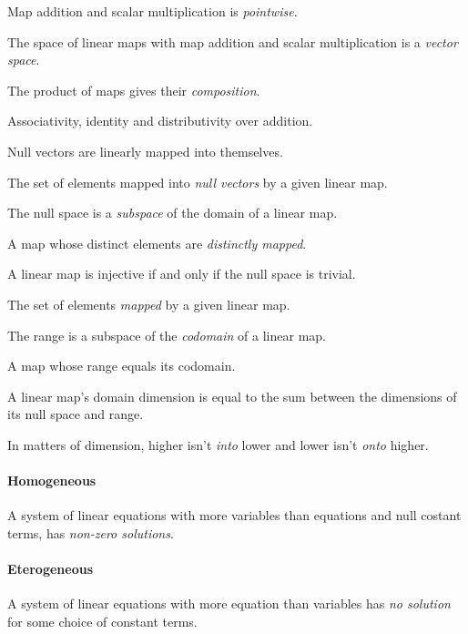 \begin{multicols}{3}
  Map addition and scalar multiplication is \textit{pointwise}.
  
  The space of linear maps with map addition and scalar multiplication is a \textit{vector space}.

  The product of maps gives their \textit{composition}.

  Associativity, identity and distributivity over addition.

  Null vectors are linearly mapped into themselves.

  The set of elements mapped into \textit{null vectors} by a given linear map.

  The null space is a \textit{subspace} of the domain of a linear map.

  A map whose distinct elements are \textit{distinctly mapped}.

  A linear map is injective if and only if the null space is trivial.

  The set of elements \textit{mapped} by a given linear map.

  The range is a subspace of the \textit{codomain} of a linear map.

  A map whose range equals its codomain.

  A linear map's domain dimension is equal to the sum between the dimensions of its null space and range.

  In matters of dimension, higher isn't \textit{into} lower and lower isn't \textit{onto} higher.

  \paragraph{\textbf{Homogeneous}}
  A system of linear equations with more variables than equations and null costant terms, has \textit{non-zero solutions}.
  
  \paragraph{\textbf{Eterogeneous}}
  A system of linear equations with more equation than variables has \textit{no solution} for some choice of constant terms.
  

\end{multicols}
